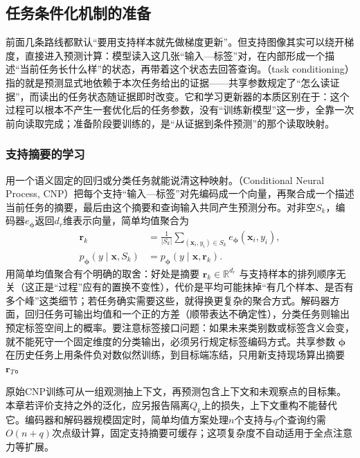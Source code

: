 \subsection{任务条件化机制的准备}
\label{sec:ket-transfer-conditioning-preparation}

前面几条路线都默认“要用支持样本就先做梯度更新”。但支持图像其实可以绕开梯度，直接进入预测计算：模型读入这几张“输入—标签”对，在内部形成一个描述“当前任务长什么样”的状态，再带着这个状态去回答查询。（task conditioning）指的就是预测显式地依赖于本次任务给出的证据——共享参数规定了“怎么读证据”，而读出的任务状态随证据即时改变。它和学习更新器的本质区别在于：这个过程可以根本不产生一套优化后的任务参数，没有“训练新模型”这一步，全靠一次前向读取完成；准备阶段要训练的，是“从证据到条件预测”的那个读取映射。

\subsubsection{支持摘要的学习}
\label{sec:ket-transfer-support-summary}

用一个语义固定的回归或分类任务就能说清这种映射。（Conditional Neural Process, CNP）把每个支持“输入—标签”对先编码成一个向量，再聚合成一个描述当前任务的摘要，最后由这个摘要和查询输入共同产生预测分布。对非空$S_k$，编码器$e_{\bm\phi}$返回$d_r$维表示向量，简单均值聚合为
\begin{align}
  \bm r_k&=\frac1{|S_k|}\sum_{(\bm x_i,y_i)\in S_k}
                   e_{\bm\phi}(\bm x_i,y_i), \nonumber\\
  p_{\bm\phi}(y\mid\bm x,S_k)
      &=p_{\bm\phi}(y\mid\bm x,\bm r_k).
  \label{eq:ket-transfer-cnp}
\end{align}
用简单均值聚合有个明确的取舍：好处是摘要 $\bm r_k\in\mathbb R^{d_r}$ 与支持样本的排列顺序无关（这正是“过程”应有的置换不变性），代价是平均可能抹掉“有几个样本、是否有多个峰”这类细节；若任务确实需要这些，就得换更复杂的聚合方式。解码器方面，回归任务可输出均值和一个正的方差（顺带表达不确定性），分类任务则输出预定标签空间上的概率。要注意标签接口问题：如果未来类别数或标签含义会变，就不能死守一个固定维度的分类输出，必须另行规定标签编码方式。共享参数 $\bm\phi$ 在历史任务上用条件负对数似然训练，到目标端冻结，只用新支持现场算出摘要 $\bm r_T$。

原始CNP训练可从一组观测抽上下文，再预测包含上下文和未观察点的目标集。本章若评价支持之外的泛化，应另报告隔离$Q_k$上的损失，上下文重构不能替代它。编码器和解码器规模固定时，简单均值方案处理$n$个支持与$q$个查询约需$O(n+q)$次点级计算，固定支持摘要可缓存；这项复杂度不自动适用于全点注意力等扩展。

